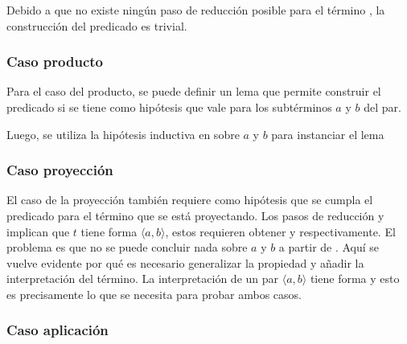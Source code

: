 Debido a que no existe ningún paso de reducción posible para el término \const{$\star$}, la construcción del predicado es trivial.


\subsubsection{Caso producto}

Para el caso del producto, se puede definir un lema que permite construir el predicado si se tiene como hipótesis que \snstar vale para los subtérminos $a$ y $b$ del par.



Luego, se utiliza la hipótesis inductiva en  sobre $a$ y $b$ para instanciar el lema


\subsubsection{Caso proyección}

El caso de la proyección también requiere como hipótesis que se cumpla el predicado para el término que se está proyectando.
Los pasos de reducción  y  implican que $t$ tiene forma $\langle a, b \rangle$, estos requieren obtener \snstar {} y \snstar {} respectivamente.
El problema es que no se puede concluir nada sobre $a$ y $b$ a partir de  .
Aquí se vuelve evidente por qué es necesario generalizar la propiedad  y añadir la interpretación del término.
La interpretación de un par $\langle a, b \rangle$ tiene forma \snstar{}  \snstar{} y esto es precisamente lo que se necesita para probar ambos casos.


\subsubsection{Caso aplicación}

